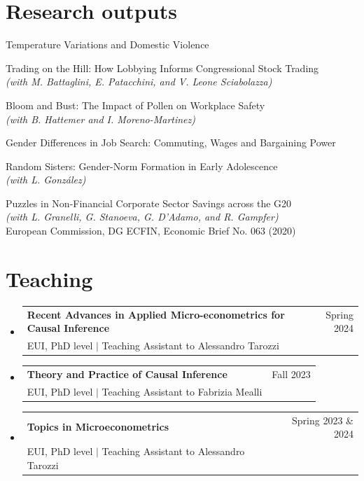 \documentclass[10pt, a4paper]{article}
\makeatletter
\newcommand{\CVSubheading}[4]{
  \vspace{-2pt}\item
    \begin{tabular*}{0.97\textwidth}[t]{l@{\extracolsep{\fill}}r}
      \textbf{#1} & #2 \\
      \small#3 & \small #4 \\
    \end{tabular*}\vspace{-7pt}
}
\newcommand{\CVSubHeadingListStart}{\begin{itemize}[leftmargin=0.5cm, label={}]}
\newcommand{\CVSubHeadingListEnd}{\end{itemize}}
\makeatother
\begin{document}
\section{Research outputs}
 \begin{itemize}[leftmargin=0.5cm, label={}]
    \small{\item{
	Temperature Variations and Domestic Violence\\
	\vspace{.2cm}
	
	Trading on the Hill: How Lobbying Informs Congressional Stock Trading \\
	\textit{(with M. Battaglini, E. Patacchini, and V. Leone Sciabolazza)} \\
	\vspace{.2cm} 
	
	Bloom and Bust: The Impact of Pollen on Workplace Safety \\
	\textit{(with B. Hattemer and I. Moreno-Martinez)} \\
	\vspace{.2cm}
	
	Gender Differences in Job Search: Commuting, Wages and Bargaining Power \\
	\vspace{.2cm}
	
	Random Sisters: Gender-Norm Formation in Early Adolescence \\
	\textit{(with L. González)} \\
	\vspace{.2cm}
	
	Puzzles in Non-Financial Corporate Sector Savings across the G20 \\
	\textit{(with L. Granelli, G. Stanoeva, G. D’Adamo, and R. Gampfer)} \\
	European Commission, DG ECFIN, Economic Brief No. 063 (2020)
    }}
 \end{itemize}


\section{Teaching}
  \CVSubHeadingListStart
    \CVSubheading
      {{Recent Advances in Applied Micro-econometrics for Causal Inference}}{Spring 2024}
      {EUI, PhD level $|$ Teaching Assistant to Alessandro Tarozzi} {}
     \CVSubheading
      {{Theory and Practice of Causal Inference}}{Fall 2023}
      {EUI, PhD level $|$ Teaching Assistant to Fabrizia Mealli} {}
    \CVSubheading
      {{Topics in Microeconometrics}}{Spring 2023 \& 2024}
      {EUI, PhD level $|$ Teaching Assistant to Alessandro Tarozzi} {}
  \CVSubHeadingListEnd
\end{document}
